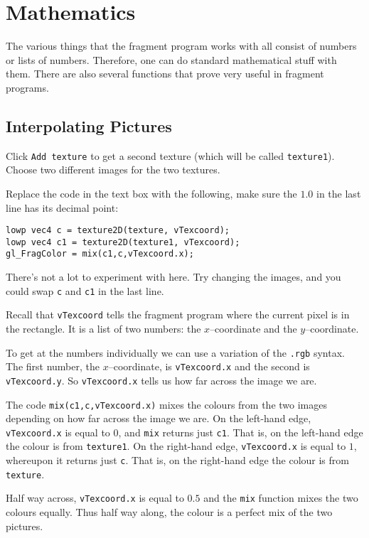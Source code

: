 \documentclass[
  html5,%
  mathml,%
  use filename%
]{internet}
\makeatletter
\let\prev@sec=\section
\renewcommand\section{\clearpage\prev@sec}
\makeatother
\begin{document}
\section{Mathematics}
\label{sec:maths}

The various things that the fragment program works with all consist of numbers or lists of numbers.
Therefore, one can do standard mathematical stuff with them.
There are also several functions that prove very useful in fragment programs.

\subsection{Interpolating Pictures}

Click \verb+Add texture+ to get a second texture (which will be called \verb+texture1+).
Choose two different images for the two textures.

Replace the code in the text box with the following, make sure the \(1.0\) in the last line has its decimal point:

\begin{tcolorbox}
\begin{verbatim}
lowp vec4 c = texture2D(texture, vTexcoord);
lowp vec4 c1 = texture2D(texture1, vTexcoord);
gl_FragColor = mix(c1,c,vTexcoord.x);
\end{verbatim}
\end{tcolorbox}

There's not a lot to experiment with here.
Try changing the images, and you could swap \verb+c+ and \verb+c1+ in the last line.

\begin{tcolorbox}
Recall that \verb+vTexcoord+ tells the fragment program where the current pixel is in the rectangle.
It is a list of two numbers: the \(x\)--coordinate and the \(y\)--coordinate.

To get at the numbers individually we can use a variation of the \verb!.rgb! syntax.
The first number, the \(x\)--coordinate, is \verb+vTexcoord.x+ and the second is \verb+vTexcoord.y+.
So \verb+vTexcoord.x+ tells us how far across the image we are.

The code \verb!mix(c1,c,vTexcoord.x)! mixes the colours from the two images depending on how far across the image we are.
On the left-hand edge, \verb+vTexcoord.x+ is equal to \(0\), and \verb!mix! returns just \verb+c1+.
That is, on the left-hand edge the colour is from \verb+texture1+.
On the right-hand edge, \verb+vTexcoord.x+ is equal to \(1\), whereupon it returns just \verb+c+.
That is, on the right-hand edge the colour is from \verb+texture+.

Half way across, \verb+vTexcoord.x+ is equal to \(0.5\) and the \verb!mix! function mixes the two colours equally.
Thus half way along, the colour is a perfect mix of the two pictures.
\end{tcolorbox}
\end{document}
